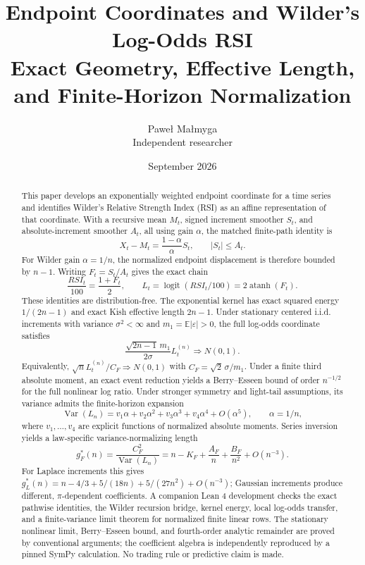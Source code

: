 \documentclass[11pt]{article}
\title{Endpoint Coordinates and Wilder's Log-Odds RSI\\
\large Exact Geometry, Effective Length, and Finite-Horizon Normalization}
\author{Pawe{\l} Ma{\l}myga\\\small Independent researcher}
\date{September 2026}
\newcommand{\E}{\mathbb E}
\newcommand{\Var}{\operatorname{Var}}
\newcommand{\atanh}{\operatorname{atanh}}
\newcommand{\logit}{\operatorname{logit}}
\begin{document}
\maketitle

\begin{abstract}
This paper develops an exponentially weighted endpoint coordinate for a time
series and identifies Wilder's Relative Strength Index (RSI) as an affine
representation of that coordinate.  With a recursive mean $M_t$, signed
increment smoother $S_t$, and absolute-increment smoother $A_t$, all using
gain $\alpha$, the matched finite-path identity is
\[
X_t-M_t=\frac{1-\alpha}{\alpha}S_t,
\qquad |S_t|\le A_t.
\]
For Wilder gain $\alpha=1/n$, the normalized endpoint displacement is therefore
bounded by $n-1$.  Writing $F_t=S_t/A_t$ gives the exact chain
\[
\frac{RSI_t}{100}=\frac{1+F_t}{2},
\qquad
L_t=\logit(RSI_t/100)=2\atanh(F_t).
\]
These identities are distribution-free.  The exponential kernel has exact
squared energy $1/(2n-1)$ and exact Kish effective length $2n-1$.  Under
stationary centered i.i.d. increments with variance $\sigma^2<\infty$ and
$m_1=\E|\varepsilon|>0$, the full log-odds coordinate satisfies
\[
\frac{\sqrt{2n-1}\,m_1}{2\sigma}L_t^{(n)}\Rightarrow N(0,1).
\]
Equivalently, $\sqrt n L_t^{(n)}/C_F\Rightarrow N(0,1)$ with
$C_F=\sqrt2\,\sigma/m_1$.  Under a finite third absolute moment, an exact
event reduction yields a Berry--Esseen bound of order $n^{-1/2}$ for the full
nonlinear log ratio.  Under stronger symmetry and light-tail assumptions, its
variance admits the finite-horizon expansion
\[
\Var(L_n)=v_1\alpha+v_2\alpha^2+v_3\alpha^3+v_4\alpha^4+O(\alpha^5),\qquad \alpha=1/n,
\]
where $v_1,\ldots,v_4$ are explicit functions of normalized absolute moments.
Series inversion yields a law-specific variance-normalizing length
\[
g_F^*(n)=\frac{C_F^2}{\Var(L_n)}
=n-K_F+\frac{A_F}{n}+\frac{B_F}{n^2}+O(n^{-3}).
\]
For Laplace increments this gives
$g_L^*(n)=n-4/3+5/(18n)+5/(27n^2)+O(n^{-3})$; Gaussian increments produce
different, $\pi$-dependent coefficients.  A companion Lean 4 development
checks the exact pathwise identities, the Wilder recursion bridge, kernel
energy, local log-odds transfer, and a finite-variance limit theorem for
normalized finite linear rows.  The stationary nonlinear limit,
Berry--Esseen bound, and fourth-order analytic remainder are proved by
conventional arguments; the coefficient algebra is independently reproduced
by a pinned SymPy calculation.  No trading rule or predictive claim is made.
\end{abstract}
\end{document}
